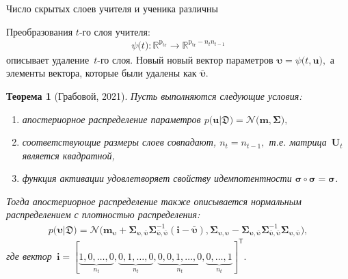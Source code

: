\documentclass[10pt,pdf,hyperref={unicode}]{beamer}
\newtheorem{rustheorem}{Теорема}
\begin{document}

\begin{frame}{Число скрытых слоев учителя и ученика различны}

Преобразования $t$-го слоя учителя:
\[
\begin{aligned}
\psi\bigr(t\bigr) : \mathbb{R}^{\text{p}_{\text{tr}}} \to \mathbb{R}^{\text{p}_{\text{tr}}-n_tn_{t-1}}
\end{aligned}
\]
описывает удаление~$t$-го слоя. Новый новый вектор параметров $\bm{\upsilon} = \psi\bigr(t, \textbf{u}\bigr),$ а элементы вектора, которые были удалены как $\bar{\bm{\upsilon}}.$

\begin{rustheorem}[Грабовой, 2021]
Пусть выполняются следующие условия:
\begin{enumerate}[1)]
\item апостериорное распределение параметров $p\bigr(\textbf{u}|\mathfrak{D}\bigr) = \mathcal{N}\bigr(\textbf{m}, \bm{\Sigma}\bigr),$
\item соответствующие размеры слоев совпадают, $n_t=n_{t-1},$ т.е. матрица~$\mathbf{U}_t$ является квадратной,
\item функция активации удовлетворяет свойству идемпотентности $\bm{\sigma} \circ \bm{\sigma} = \bm{\sigma}$.
\end{enumerate}
Тогда апостериорное распределение также описывается нормальным распределением с плотностью распределения:
\[
\label{eq:ap:5}
\begin{aligned}
p\bigr(\bm{\upsilon}|\mathfrak{D}\bigr) = \mathcal{N}\bigr(\textbf{m}_{\bm{\upsilon}}+\bm{\Sigma}_{\bm{\upsilon},\bar{\bm{\upsilon}}} \bm{\Sigma}_{\bar{\bm{\upsilon}},\bar{\bm{\upsilon}}}^{-1} \left(\textbf{i} - \bar{\bm{\upsilon}}\right), \bm{\Sigma}_{\bm{\upsilon},\bm{\upsilon}} - \bm{\Sigma}_{\bm{\upsilon},\bar{\bm{\upsilon}}}\bm{\Sigma}_{\bar{\bm{\upsilon}},\bar{\bm{\upsilon}}}^{-1}\bm{\Sigma}_{\bm{\upsilon},\bar{\bm{\upsilon}}}\bigr),
\end{aligned}
\]
где вектор~$
\textbf{i}=[\underbrace{1, 0, \ldots, 0}_{n_t}, \underbrace{0, 1, \ldots, 0}_{n_t}, \underbrace{0, 0, 1, \ldots, 0}_{n_t}, \underbrace{0, \ldots, 1}_{n_t}]^{\mathsf{T}}.
$
\end{rustheorem}

\end{frame}
\end{document}
